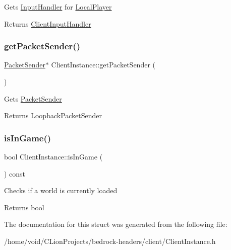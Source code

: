 Gets \mbox{\hyperlink{struct_input_handler}{Input\+Handler}} for \mbox{\hyperlink{struct_local_player}{Local\+Player}} \begin{DoxyReturn}{Returns}
\mbox{\hyperlink{struct_client_input_handler}{Client\+Input\+Handler}} 
\end{DoxyReturn}
\mbox{\label{struct_client_instance_aad3a481a0988c04c3fade2b7f7e401b0}} 
\subsubsection{\texorpdfstring{getPacketSender()}{getPacketSender()}}
{\footnotesize\ttfamily \mbox{\hyperlink{struct_packet_sender}{Packet\+Sender}}$\ast$ Client\+Instance\+::get\+Packet\+Sender (\begin{DoxyParamCaption}{ }\end{DoxyParamCaption})}

Gets \mbox{\hyperlink{struct_packet_sender}{Packet\+Sender}} \begin{DoxyReturn}{Returns}
Loopback\+Packet\+Sender 
\end{DoxyReturn}
\mbox{\label{struct_client_instance_ad2672f5b5b1b5e7ee5eda83e527cd753}} 
\subsubsection{\texorpdfstring{isInGame()}{isInGame()}}
{\footnotesize\ttfamily bool Client\+Instance\+::is\+In\+Game (\begin{DoxyParamCaption}{ }\end{DoxyParamCaption}) const}

Checks if a world is currently loaded \begin{DoxyReturn}{Returns}
bool 
\end{DoxyReturn}


The documentation for this struct was generated from the following file\+:\begin{DoxyCompactItemize}
\item 
/home/void/\+C\+Lion\+Projects/bedrock-\/headers/client/Client\+Instance.\+h\end{DoxyCompactItemize}
